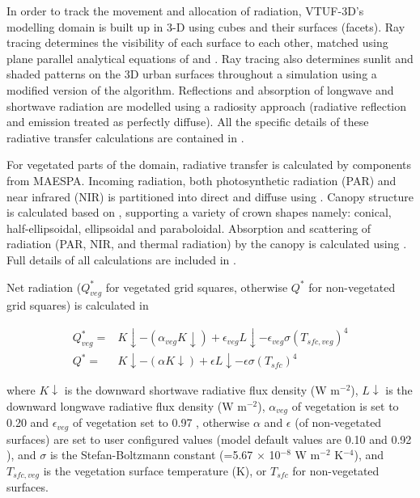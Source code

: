 \documentclass[final,3p,times,authoryear]{elsarticle}
\begin{document}
In order to track the movement and allocation of radiation, VTUF-3D’s modelling domain is built up in 3-D using cubes and their surfaces (facets). Ray tracing determines the visibility of each surface to each other, matched using plane parallel analytical equations of \cite{Siegel2001} and \cite{Hottel1967}. Ray tracing also determines sunlit and shaded patterns on the 3D urban surfaces throughout a simulation using a modified version of the \cite{Soux2004} algorithm. Reflections and absorption of longwave and shortwave radiation are modelled using a radiosity approach (radiative reflection and emission treated as perfectly diffuse). All the specific details of these radiative transfer calculations are contained in \cite{Krayenhoff2007}.

For vegetated parts of the domain, radiative transfer is calculated by components from MAESPA. Incoming radiation, both photosynthetic radiation (PAR) and near infrared (NIR) is partitioned into direct and diffuse using \cite{Weiss1985}. Canopy structure is calculated based on \cite{Wang1990}, supporting a variety of crown shapes namely: conical, half-ellipsoidal, ellipsoidal and paraboloidal. Absorption and scattering of radiation (PAR, NIR, and thermal radiation) by the canopy is calculated using \cite{Norman1979}. Full details of all calculations are included in \cite{Duursma2012}.

Net radiation ($Q^{*}_{veg}$ for vegetated grid squares, otherwise $Q^{*}$ for non-vegetated grid squares) is calculated in 

\begin{equation}\label{eq:rnet}
\begin{split}
Q^{*}_{veg} =& K\downarrow - (\alpha _{veg} K\downarrow) + \epsilon _{veg} L\downarrow - \epsilon _{veg} \sigma  (T_{sfc,veg}) ^{4} 
\\
Q^{*} =& K\downarrow - (\alpha K\downarrow) + \epsilon L\downarrow - \epsilon \sigma  (T_{sfc}) ^{4} 
\end{split}
\end{equation}

where $K\downarrow$ is the downward shortwave radiative flux density (W m$^{-2}$), $L\downarrow$ is the downward longwave radiative flux density (W m$^{-2}$), $\alpha _{veg}$ of vegetation is set to 0.20 and $\epsilon _{veg}$ of vegetation set to 0.97 \citep[p. 12]{Oke1987z}, otherwise $\alpha$ and $\epsilon$ (of non-vegetated surfaces) are set to user configured values (model default values are 0.10 and 0.92 \citep{Krayenhoff2007}), and $\sigma$ is the Stefan-Boltzmann constant (=5.67 $\times$ 10$^{-8}$ W m$^{-2}$ K$^{-4}$), and $T_{sfc,veg}$ is the vegetation surface temperature (K), or $T_{sfc}$ for non-vegetated surfaces.
\end{document}
